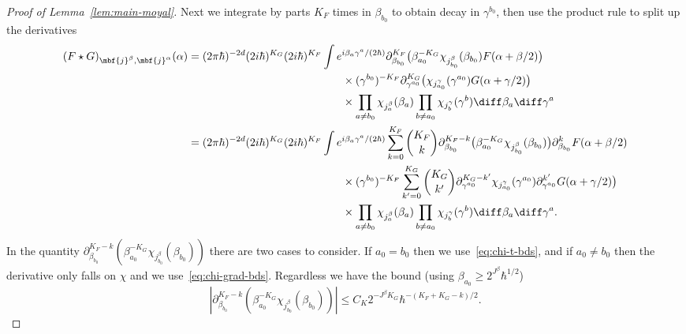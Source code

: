 \documentclass{article}
\numberwithin{equation}{section}
\begin{document}
\begin{proof}[Proof of Lemma~\ref{lem:main-moyal}]
	Next we integrate by parts $K_F$ times in $\beta_{b_0}$ to obtain decay in $\gamma^{b_0}$, then
	use the product rule to split up the derivatives
	\begin{equation}
		\begin{split}
			(F\star G)_{\mbf{j}^\beta,\mbf{j}^\alpha}(\alpha) &=
			(2\pi \hbar)^{-2d}
			(2i\hbar)^{K_G}
			(2i\hbar)^{K_F}
			\int e^{i \beta_a\gamma^a/(2\hbar)}
			\partial_{\beta_{b_0}}^{K_F}\big(
			\beta_{a_0}^{-K_G}
			\chi_{j^\beta_{b_0}}(\beta_{b_0})
			F(\alpha+\beta/2)\big) \\
			& \qquad\qquad\qquad
			\qquad\qquad\qquad
			\qquad\times
			(\gamma^{b_0})^{-K_F}
			\partial_{\gamma^{a_0}}^{K_G}\big(\chi_{j^\gamma_{a_0}}(\gamma^{a_0}) G(\alpha+\gamma/2)\big) \\
			&
			\qquad\qquad\qquad
			\qquad\qquad\qquad
			\qquad\times
			\prod_{a\not=b_0} \chi_{j^\beta_a}(\beta_a)
			\prod_{b\not=a_0} \chi_{j^\gamma_b}(\gamma^b)
			\diff \beta_a\diff\gamma^a \\
			&=
			(2\pi \hbar)^{-2d}
			(2i\hbar)^{K_G}
			(2i\hbar)^{K_F}
			\int e^{i \beta_a\gamma^a/(2\hbar)}
			\sum_{k=0}^{K_F}
			\binom{K_F}{k}
			\partial_{\beta_{b_0}}^{K_F-k}\big(
			\beta_{a_0}^{-K_G}
			\chi_{j^\beta_{b_0}}(\beta_{b_0})\big)
			\partial_{\beta_{b_0}}^{k} F(\alpha+\beta/2) \\
			& \qquad\qquad\qquad
			\qquad\qquad\qquad
			\qquad\times
			(\gamma^{b_0})^{-K_F}
			\sum_{k'=0}^{K_G}
			\binom{K_G}{k'}
			\partial_{\gamma^{a_0}}^{K_G-k'}\chi_{j^\gamma_{a_0}}(\gamma^{a_0})
			\partial_{\gamma^{a_0}}^{k'}G(\alpha+\gamma/2)\big) \\
			&
			\qquad\qquad\qquad
			\qquad\qquad\qquad
			\qquad\times
			\prod_{a\not=b_0} \chi_{j^\beta_a}(\beta_a)
			\prod_{b\not=a_0} \chi_{j^\gamma_b}(\gamma^b)
			\diff \beta_a\diff\gamma^a.
		\end{split}
	\end{equation}
	In the quantity
	$\partial_{\beta_{b_0}}^{K_F-k}
	(\beta_{a_0}^{-K_G} \chi_{j^\beta_{b_0}}
	(\beta_{b_0}))$
	there are two cases to consider.  If
	$a_0=b_0$ then we use~\eqref{eq:chi-t-bds},
	and if $a_0\not=b_0$ then the derivative
	only falls on $\chi$ and we use~\eqref{eq:chi-grad-bds}.  Regardless we have the bound
	(using $\beta_{a_0} \geq 2^{J^\beta}\hbar^{1/2}$)
	\begin{equation}
		|\partial_{\beta_{b_0}}^{K_F-k}
		(\beta_{a_0}^{-K_G} \chi_{j^\beta_{b_0}}
		(\beta_{b_0}))|
		\leq C_K
		2^{-J^\beta K_G} \hbar^{-(K_F+K_G-k)/2}.
	\end{equation}

\end{proof}
\end{document}

